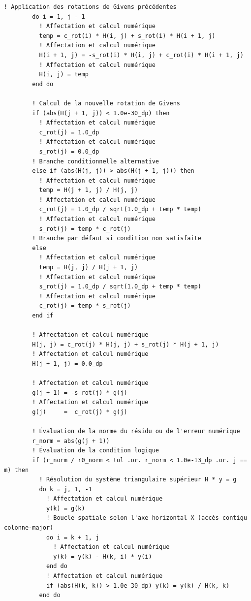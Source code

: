 \documentclass[10pt,a4paper,oneside]{book}
\begin{document}
\begin{lstlisting}[language={[95]Fortran}]
        ! Application des rotations de Givens précédentes
        do i = 1, j - 1
          ! Affectation et calcul numérique
          temp = c_rot(i) * H(i, j) + s_rot(i) * H(i + 1, j)
          ! Affectation et calcul numérique
          H(i + 1, j) = -s_rot(i) * H(i, j) + c_rot(i) * H(i + 1, j)
          ! Affectation et calcul numérique
          H(i, j) = temp
        end do

        ! Calcul de la nouvelle rotation de Givens
        if (abs(H(j + 1, j)) < 1.0e-30_dp) then
          ! Affectation et calcul numérique
          c_rot(j) = 1.0_dp
          ! Affectation et calcul numérique
          s_rot(j) = 0.0_dp
        ! Branche conditionnelle alternative
        else if (abs(H(j, j)) > abs(H(j + 1, j))) then
          ! Affectation et calcul numérique
          temp = H(j + 1, j) / H(j, j)
          ! Affectation et calcul numérique
          c_rot(j) = 1.0_dp / sqrt(1.0_dp + temp * temp)
          ! Affectation et calcul numérique
          s_rot(j) = temp * c_rot(j)
        ! Branche par défaut si condition non satisfaite
        else
          ! Affectation et calcul numérique
          temp = H(j, j) / H(j + 1, j)
          ! Affectation et calcul numérique
          s_rot(j) = 1.0_dp / sqrt(1.0_dp + temp * temp)
          ! Affectation et calcul numérique
          c_rot(j) = temp * s_rot(j)
        end if

        ! Affectation et calcul numérique
        H(j, j) = c_rot(j) * H(j, j) + s_rot(j) * H(j + 1, j)
        ! Affectation et calcul numérique
        H(j + 1, j) = 0.0_dp

        ! Affectation et calcul numérique
        g(j + 1) = -s_rot(j) * g(j)
        ! Affectation et calcul numérique
        g(j)     =  c_rot(j) * g(j)

        ! Évaluation de la norme du résidu ou de l'erreur numérique
        r_norm = abs(g(j + 1))
        ! Évaluation de la condition logique
        if (r_norm / r0_norm < tol .or. r_norm < 1.0e-13_dp .or. j == m) then
          ! Résolution du système triangulaire supérieur H * y = g
          do k = j, 1, -1
            ! Affectation et calcul numérique
            y(k) = g(k)
            ! Boucle spatiale selon l'axe horizontal X (accès contigu colonne-major)
            do i = k + 1, j
              ! Affectation et calcul numérique
              y(k) = y(k) - H(k, i) * y(i)
            end do
            ! Affectation et calcul numérique
            if (abs(H(k, k)) > 1.0e-30_dp) y(k) = y(k) / H(k, k)
          end do


\end{lstlisting}
\end{document}
